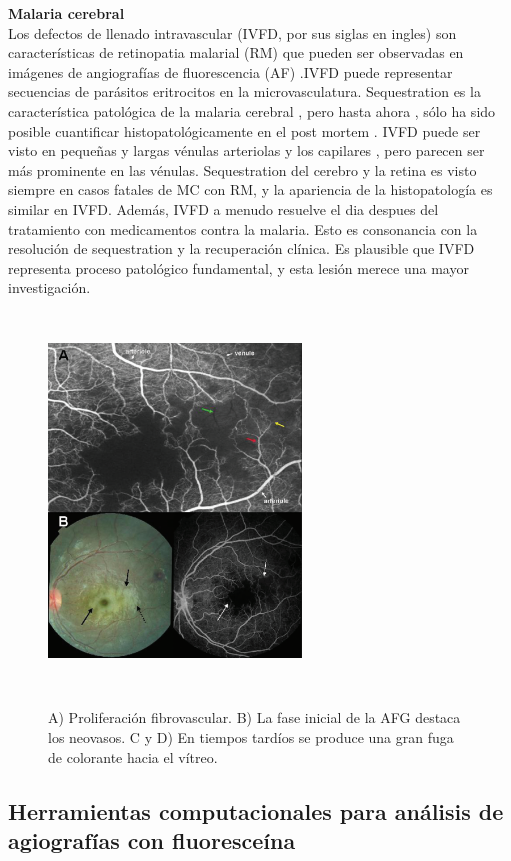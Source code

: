 \textbf{Malaria cerebral}
\\

Los defectos de llenado intravascular (IVFD, por sus siglas en ingles) son características de retinopatia malarial (RM) que pueden ser observadas en imágenes de  angiografías de fluorescencia (AF) .IVFD puede representar secuencias de parásitos eritrocitos en la microvasculatura. Sequestration es la característica patológica de la malaria cerebral , pero hasta ahora , sólo ha sido posible cuantificar histopatológicamente en el post mortem . IVFD puede ser visto en pequeñas y largas vénulas arteriolas y los capilares , pero parecen ser más prominente en las vénulas. Sequestration del cerebro y la retina es visto siempre en casos fatales de MC con RM, y la apariencia de la histopatología es similar en IVFD. Además, IVFD a menudo resuelve el dia despues del tratamiento con medicamentos contra la malaria. Esto es consonancia con  la resolución de sequestration y la recuperación clínica. Es plausible que  IVFD representa proceso patológico fundamental, y esta lesión merece una mayor investigación. \cite{zhao2015automated}


\begin{figure}[H]
\centering
\includegraphics[height=10cm,width=0.6\textwidth]{./Figures/FA_MALARIA.png}
\label{fig:lightfilter}
\caption{A) Proliferación fibrovascular. B) La fase inicial de la AFG destaca los neovasos. C y D) En tiempos tardíos se produce una gran fuga de colorante hacia el vítreo.}
\end{figure}

	\subsection{Herramientas computacionales para an\'alisis de agiograf\'ias con fluoresce\'ina}


